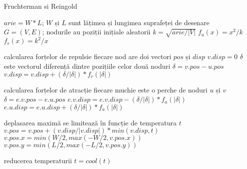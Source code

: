 \begin{algorithm}[H]
    \caption{Fruchterman si Reingold}
    \(arie=W*L\); \(W\) și \(L\) sunt lățimea și lungimea suprafeței de desenare\newline
    \(G=(V,E)\); nodurile au poziții inițiale aleatorii\newline
    \(k=\sqrt{arie/|V|}\) \newline
    \(f_a(x)=x^2/k\)\newline
    \(f_r(x)=k^2/x\)\newline 
    \begin{algorithmic}[1]
            \State calcularea forțelor de repulsie
                \State fiecare nod are doi vectori \(pos\) și \(disp\)
                \State \(v.disp=0\)
                        \State \(\delta\) este vectorul diferență dintre pozițiile celor două noduri
                        \State \(\delta=v.pos-u.pos\)
                        \State \(v.disp=v.disp+(\delta/|\delta|)*f_r(|\delta|)\)
                    \EndIf
                \EndFor
            \EndFor

            \State calcularea forțelor de atracție
                \State fiecare muchie este o perche de noduri \(u\) și \(v\)
                \State \(\delta=e.v.pos-e.u.pos\)
                \State \(e.v.disp=e.v.disp-(\delta/|\delta|)*f_a(|\delta|)\)
                \State \(e.u.disp=e.u.disp+(\delta/|\delta|)*f_a(|\delta|)\)
            \EndFor

            \State deplasarea maximă se limitează în funcție de temperatura \(t\)
                \State \(v.pos=v.pos+(v.disp/|v.disp|)*min(v.disp,t)\)
                \State \(v.pos.x=min(W/2,max(-W/2,v.pos.x))\)
                \State \(v.pos.y=min(L/2,max(-L/2,v.pos.y))\)
            \EndFor

            \State reducerea temperaturii 
            \State \(t=cool(t)\)
        \EndFor
    \end{algorithmic}
\end{algorithm}

  

